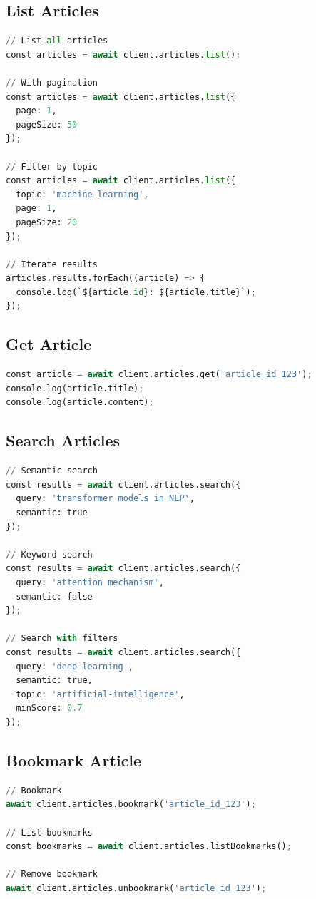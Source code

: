\documentclass{report}
\begin{document}
\subsection{List Articles}

\begin{lstlisting}[language=Python]
// List all articles
const articles = await client.articles.list();

// With pagination
const articles = await client.articles.list({
  page: 1,
  pageSize: 50
});

// Filter by topic
const articles = await client.articles.list({
  topic: 'machine-learning',
  page: 1,
  pageSize: 20
});

// Iterate results
articles.results.forEach((article) => {
  console.log(`${article.id}: ${article.title}`);
});
\end{lstlisting}

\subsection{Get Article}

\begin{lstlisting}[language=Python]
const article = await client.articles.get('article_id_123');
console.log(article.title);
console.log(article.content);
\end{lstlisting}

\subsection{Search Articles}

\begin{lstlisting}[language=Python]
// Semantic search
const results = await client.articles.search({
  query: 'transformer models in NLP',
  semantic: true
});

// Keyword search
const results = await client.articles.search({
  query: 'attention mechanism',
  semantic: false
});

// Search with filters
const results = await client.articles.search({
  query: 'deep learning',
  semantic: true,
  topic: 'artificial-intelligence',
  minScore: 0.7
});
\end{lstlisting}

\subsection{Bookmark Article}

\begin{lstlisting}[language=Python]
// Bookmark
await client.articles.bookmark('article_id_123');

// List bookmarks
const bookmarks = await client.articles.listBookmarks();

// Remove bookmark
await client.articles.unbookmark('article_id_123');
\end{lstlisting}
\end{document}

